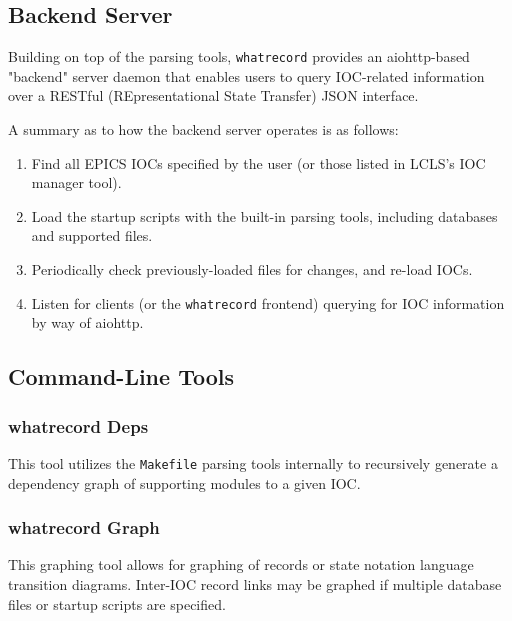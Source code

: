 \documentclass[letter,
               keeplastbox,   %
               ]{jacow}
\begin{document}
\subsection{Backend Server}

Building on top of the parsing tools, \verb_whatrecord_ provides an
aiohttp\cite{aiohttp}-based "backend" server daemon that enables users to query
IOC-related information over a RESTful (REpresentational State Transfer) JSON
interface.

A summary as to how the backend server operates is as follows:

\begin{enumerate}
  \item Find all EPICS IOCs specified by the user (or those listed in LCLS's
    IOC manager tool).
  \item Load the startup scripts with the built-in parsing tools, including
    databases and supported files.
  \item Periodically check previously-loaded files for changes, and re-load
    IOCs.
  \item Listen for clients (or the \verb_whatrecord_ frontend) querying for IOC
    information by way of aiohttp.
\end{enumerate}

\subsection{Command-Line Tools}

\subsubsection{whatrecord Deps} This tool utilizes the \verb_Makefile_ parsing
tools internally to recursively generate a dependency graph of supporting
modules to a given IOC.

\subsubsection{whatrecord Graph} This graphing tool allows for graphing of
records or state notation language transition diagrams. Inter-IOC record links
may be graphed if multiple database files or startup scripts are specified.
\end{document}
